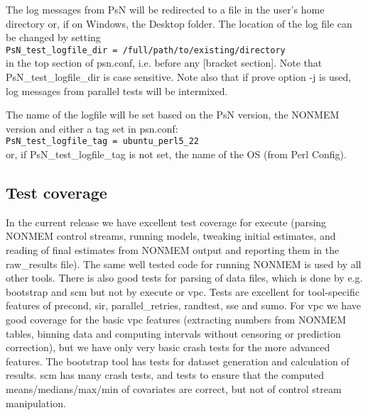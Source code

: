 The log messages from PsN will be redirected to a file in the user's home directory or, if on Windows, the
Desktop folder. The location of the log file can be changed by setting\\
\verb|PsN_test_logfile_dir = /full/path/to/existing/directory| \\
in the top section of psn.conf, i.e. before any [bracket section].
Note that PsN\_test\_logfile\_dir is case sensitive. Note also that if prove option -j is used, log messages from
parallel tests will be intermixed.

The name of the logfile will be set based on the PsN version, the NONMEM version and
either a tag set in psn.conf:\\
\verb|PsN_test_logfile_tag = ubuntu_perl5_22| \\
or, if PsN\_test\_logfile\_tag is not set, the name of the OS (from Perl Config).

\subsection{Test coverage}
In the current release we have excellent test coverage for execute (parsing NONMEM control streams, 
running models, tweaking initial estimates, and reading of final estimates from NONMEM output and reporting 
them in the raw\_results file). 
The same well tested code for running NONMEM is used by all other tools. 
There is also good tests for parsing of data files, which is done by e.g. bootstrap and scm but not by execute or
vpc.
Tests are excellent for tool-specific features of precond, sir, parallel\_retries, randtest, sse and sumo. 
For vpc we have good coverage for the basic vpc features (extracting numbers from NONMEM tables, binning data and 
computing intervals without censoring or prediction correction), but we have only very basic crash tests for the 
more advanced features. The bootstrap tool has tests for dataset generation and calculation of results.
scm has many crash tests, and tests to ensure that the computed means/medians/max/min of covariates are correct, 
but not of control stream manipulation.

